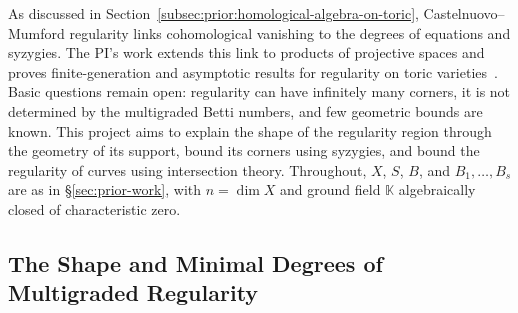 \documentclass[11pt,reqno]{amsart}
\theoremstyle{remark}
\newcommand{\reg}{\operatorname{reg}}
\newcommand{\Pic}{\operatorname{Pic}}
\newcommand{\KK}{\mathbb{K}}
\newcommand{\ZZ}{\mathbb{Z}}
\begin{document}
As discussed in Section~\ref{subsec:prior:homological-algebra-on-toric}, Castelnuovo--Mumford regularity links cohomological vanishing to the degrees of equations and syzygies. The PI's work extends this link to products of projective spaces and proves finite-generation and asymptotic results for regularity on toric varieties~\cite{bruceHellerSayrafi22,bruceHellerSayrafi26}. Basic questions remain open: regularity can have infinitely many corners, it is not determined by the multigraded Betti numbers, and few geometric bounds are known. This project aims to explain the shape of the regularity region through the geometry of its support, bound its corners using syzygies, and bound the regularity of curves using intersection theory. Throughout, $X$, $S$, $B$, and $B_1,\ldots,B_s$ are as in \S\ref{sec:prior-work}, with $n=\dim X$ and ground field $\KK$ algebraically closed of characteristic zero.

\subsection{The Shape and Minimal Degrees of Multigraded Regularity}\label{subsec:shape-of-regularity}
\end{document}

